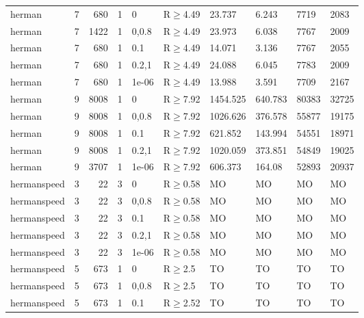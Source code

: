 \begin{longtable}{llrrllllll}
 herman        & 7        &    	680 &   1 & 0     & R$\geq$4.49  & 23.737   & 6.243    & 7719    & 2083   \\
 herman        & 7        &   	1422 &   1 & 0,0.8 & R$\geq$4.49  & 23.973   & 6.038    & 7767    & 2009   \\
 herman        & 7        &    	680 &   1 & 0.1   & R$\geq$4.49  & 14.071   & 3.136    & 7767    & 2055   \\
 herman        & 7        &    	680 &   1 & 0.2,1 & R$\geq$4.49  & 24.088   & 6.045    & 7783    & 2009   \\
 herman        & 7        &    	680 &   1 & 1e-06 & R$\geq$4.49  & 13.988   & 3.591    & 7709    & 2167   \\
 herman        & 9        &   	8008 &   1 & 0     & R$\geq$7.92  & 1454.525 & 640.783  & 80383   & 32725  \\
 herman        & 9        &   	8008 &   1 & 0,0.8 & R$\geq$7.92  & 1026.626 & 376.578  & 55877   & 19175  \\
 herman        & 9        &   	8008 &   1 & 0.1   & R$\geq$7.92  & 621.852  & 143.994  & 54551   & 18971  \\
 herman        & 9        &   	8008 &   1 & 0.2,1 & R$\geq$7.92  & 1020.059 & 373.851  & 54849   & 19025  \\
 herman        & 9        &   	3707 &   1 & 1e-06 & R$\geq$7.92  & 606.373  & 164.08   & 52893   & 20937  \\
 hermanspeed   & 3        &     	22 &   3 & 0     & R$\geq$0.58  & MO       & MO       & MO      & MO     \\
 hermanspeed   & 3        &     	22 &   3 & 0,0.8 & R$\geq$0.58  & MO       & MO       & MO      & MO     \\
 hermanspeed   & 3        &     	22 &   3 & 0.1   & R$\geq$0.58  & MO       & MO       & MO      & MO     \\
 hermanspeed   & 3        &     	22 &   3 & 0.2,1 & R$\geq$0.58  & MO       & MO       & MO      & MO     \\
 hermanspeed   & 3        &     	22 &   3 & 1e-06 & R$\geq$0.58  & MO       & MO       & MO      & MO     \\
 hermanspeed   & 5        &    	673 &   1 & 0     & R$\geq$2.5   & TO       & TO       & TO      & TO     \\
 hermanspeed   & 5        &    	673 &   1 & 0,0.8 & R$\geq$2.5   & TO       & TO       & TO      & TO     \\
 hermanspeed   & 5        &    	673 &   1 & 0.1   & R$\geq$2.52  & TO       & TO       & TO      & TO     \\

\end{longtable}
